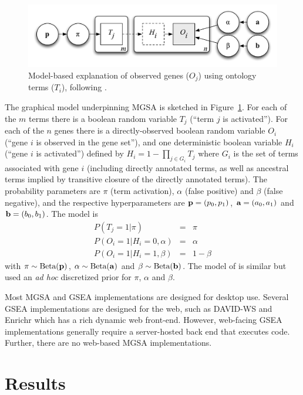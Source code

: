 \begin{figure}
\includegraphics[width=\columnwidth]{model}
\caption{
  \label{fig:model}
  Model-based explanation of observed genes ($O_j$) using ontology terms ($T_i$), following \cite{pmid20172960}.
}
\end{figure}

The graphical model underpinning MGSA is sketched in Figure~\ref{fig:model}.
For each of the $m$ terms there
is a boolean random variable
$T_j$ (``term $j$ is activated'').
For each of the $n$ genes there is a directly-observed boolean random variable
$O_i$ (``gene $i$ is observed in the gene set''),
and one deterministic boolean variable
$H_i$ (``gene $i$ is activated'')
defined by $H_i = 1 - \prod_{j \in G_i} T_j$
where $G_i$ is the set of terms associated with gene $i$
(including directly annotated terms, as well as ancestral terms implied by transitive closure of the directly annotated terms).
The probability parameters are $\pi$ (term activation), $\alpha$ (false positive) and $\beta$ (false negative),
and the respective hyperparameters are ${\bf p}=(p_0,p_1)$, ${\bf a}=(a_0,a_1)$ and ${\bf b}=(b_0,b_1)$.
The model is
\begin{eqnarray*}
P(T_j=1|\pi) & = & \pi \\
P(O_i=1|H_i=0,\alpha) & = & \alpha \\
P(O_i=1|H_i=1,\beta) & = & 1-\beta
\end{eqnarray*}
with
$\pi \sim \mbox{Beta}({\bf p})$,
$\alpha \sim \mbox{Beta}({\bf a})$ and
$\beta \sim \mbox{Beta}({\bf b})$.
The model of \cite{pmid20172960} is similar but used an
{\em ad hoc} discretized prior for $\pi$, $\alpha$ and $\beta$.

Most MGSA and GSEA implementations are designed for desktop use.
Several GSEA implementations are designed for the web, such as
DAVID-WS \citep{pmid22543366} and
Enrichr \citep{pmid23586463,pmid25971742,pmid27141961}
which has a rich dynamic web front-end.
However, web-facing GSEA implementations generally require a server-hosted back end that executes code.
Further, there are no web-based MGSA implementations.

\section*{Results}

